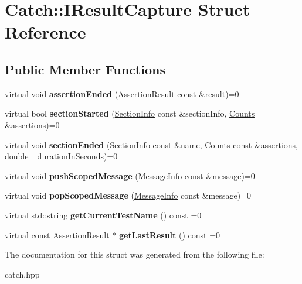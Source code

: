 \hypertarget{structCatch_1_1IResultCapture}{
\section{Catch::IResultCapture Struct Reference}
\label{structCatch_1_1IResultCapture}
}
\subsection*{Public Member Functions}
\begin{DoxyCompactItemize}
\item 
\hypertarget{structCatch_1_1IResultCapture_ae45e08bccc5fb434656d4f2e44742223}{
virtual void {\bfseries assertionEnded} (\hyperlink{classCatch_1_1AssertionResult}{AssertionResult} const \&result)=0}
\label{structCatch_1_1IResultCapture_ae45e08bccc5fb434656d4f2e44742223}

\item 
\hypertarget{structCatch_1_1IResultCapture_a5b76ed52badcb64cf374202e12b81a03}{
virtual bool {\bfseries sectionStarted} (\hyperlink{structCatch_1_1SectionInfo}{SectionInfo} const \&sectionInfo, \hyperlink{structCatch_1_1Counts}{Counts} \&assertions)=0}
\label{structCatch_1_1IResultCapture_a5b76ed52badcb64cf374202e12b81a03}

\item 
\hypertarget{structCatch_1_1IResultCapture_a110d3d300709d114b3e4718fff021b29}{
virtual void {\bfseries sectionEnded} (\hyperlink{structCatch_1_1SectionInfo}{SectionInfo} const \&name, \hyperlink{structCatch_1_1Counts}{Counts} const \&assertions, double \_\-durationInSeconds)=0}
\label{structCatch_1_1IResultCapture_a110d3d300709d114b3e4718fff021b29}

\item 
\hypertarget{structCatch_1_1IResultCapture_a91d154c1e087e383dcde5aad95cb6a05}{
virtual void {\bfseries pushScopedMessage} (\hyperlink{structCatch_1_1MessageInfo}{MessageInfo} const \&message)=0}
\label{structCatch_1_1IResultCapture_a91d154c1e087e383dcde5aad95cb6a05}

\item 
\hypertarget{structCatch_1_1IResultCapture_a42bcb13276706bf8c3ce081ce16d37fd}{
virtual void {\bfseries popScopedMessage} (\hyperlink{structCatch_1_1MessageInfo}{MessageInfo} const \&message)=0}
\label{structCatch_1_1IResultCapture_a42bcb13276706bf8c3ce081ce16d37fd}

\item 
\hypertarget{structCatch_1_1IResultCapture_aea1617f4a84cc648246aa3ed6918b5bf}{
virtual std::string {\bfseries getCurrentTestName} () const =0}
\label{structCatch_1_1IResultCapture_aea1617f4a84cc648246aa3ed6918b5bf}

\item 
\hypertarget{structCatch_1_1IResultCapture_ab18872c89fab97405a56e9c6a4919736}{
virtual const \hyperlink{classCatch_1_1AssertionResult}{AssertionResult} $\ast$ {\bfseries getLastResult} () const =0}
\label{structCatch_1_1IResultCapture_ab18872c89fab97405a56e9c6a4919736}

\end{DoxyCompactItemize}


The documentation for this struct was generated from the following file:\begin{DoxyCompactItemize}
\item 
catch.hpp\end{DoxyCompactItemize}

